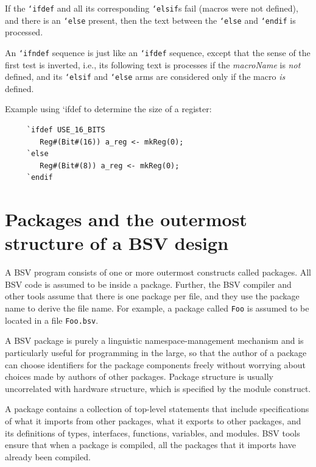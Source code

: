 \documentclass[twoside,letterpaper]{article}
\newcommand{\BSV}{BSV}
\newcommand{\nterm}[1]{\emph{#1}}
\begin{document}
If the \texttt{`ifdef} and all its corresponding \texttt{`elsif}s fail (macros
were not defined), and there is an \texttt{`else} present, then the text
between the \texttt{`else} and \texttt{`endif} is processed.

An \texttt{`ifndef} sequence is just like an \texttt{`ifdef} sequence, except
that the sense of the first test is inverted, i.e., its following text
is processes if the \nterm{macroName} is \emph{not} defined, and its
\texttt{`elsif} and \texttt{`else} arms are considered only if the macro
\emph{is} defined.

Example using `ifdef to determine the size of a register:
\begin{verbatim}
     `ifdef USE_16_BITS       
        Reg#(Bit#(16)) a_reg <- mkReg(0);
     `else
        Reg#(Bit#(8)) a_reg <- mkReg(0);
     `endif
\end{verbatim}


\section{Packages and the outermost structure of a {\BSV} design}

\label{sec-packages}


A {\BSV} program consists of one or more outermost constructs called
packages.  All {\BSV} code is assumed to be inside a package.  Further, the
{\BSV} compiler and other tools assume that there is one package per
file, and they use the package name to derive the file name.  For
example, a package called \texttt{Foo} is assumed to be located in a file
\texttt{Foo.bsv}.

A {\BSV} package is purely a linguistic namespace-management mechanism
and is particularly useful for programming in the large, so that the
author of a package can choose identifiers for the package components
freely without worrying about choices made by authors of other
packages.  Package structure is usually uncorrelated with hardware
structure, which is specified by the module construct.

A package contains a collection of top-level statements that include
specifications of what it imports from other packages, what it exports
to other packages, and its definitions of types, interfaces,
functions, variables, and modules.  {\BSV} tools ensure that when a
package is compiled, all the packages that it imports have already
been compiled.
\end{document}
